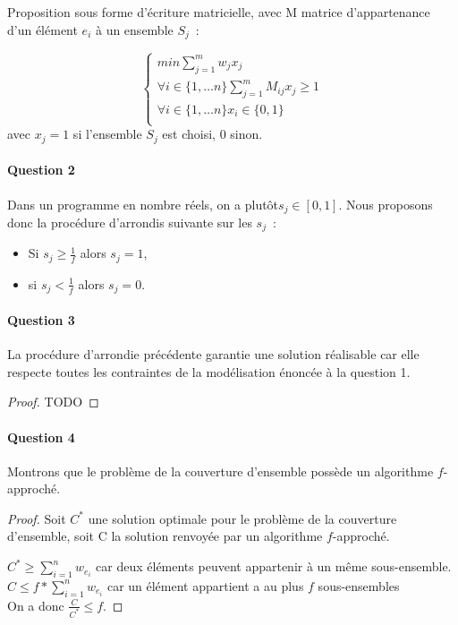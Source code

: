 \documentclass[a4paper, 12pt]{article}
\begin{document}
Proposition sous forme  d'écriture matricielle, avec M matrice
d'appartenance d'un élément $e_i$ à un ensemble $S_j$~:

\begin{equation}
\begin{cases}
min \sum_{j=1}^m w_j x_j\\
\forall i \in \{1, \dots n \} \sum_{j=1}^{m} M_{ij}x_{j} \geq 1 \\
\forall i \in \{1, \dots n\} x_i \in \{0,1\} \\
\end{cases}
\end{equation}
avec $x_j = 1$ si l'ensemble $S_j$ est choisi, 0 sinon.

\paragraph{Question 2}
 Dans un programme en nombre réels, on a plutôt$ s_j \in [0,1]$. Nous
 proposons donc la procédure d'arrondis suivante sur les $s_j$~:
\begin{itemize}
\item Si $s_j \geq \frac{1}{f}$ alors $s_j = 1$,
\item si $s_j < \frac{1}{f}$ alors $s_j = 0$.
\end{itemize}

\paragraph{Question 3}

La procédure d'arrondie précédente garantie une solution réalisable
car elle respecte toutes les contraintes de la modélisation énoncée à
la question 1.

\begin{proof}
TODO
\end{proof}

\paragraph{Question 4}

Montrons que le problème de la couverture d'ensemble possède un
algorithme $f$-approché.

\begin{proof}
Soit $C^*$ une solution optimale pour le problème de la couverture
d'ensemble, soit C la solution renvoyée par un algorithme
$f$-approché.

$C^* \geq  \sum_{i=1}^n w_{e_i}$ car deux éléments peuvent appartenir à un même sous-ensemble.
$C \leq f * \sum_{i=1}^n w_{e_i}$ car un élément appartient a au plus $f$ sous-ensembles \\

On a donc $\frac{C}{C^*} \leq f$.
\end{proof}
\end{document}
